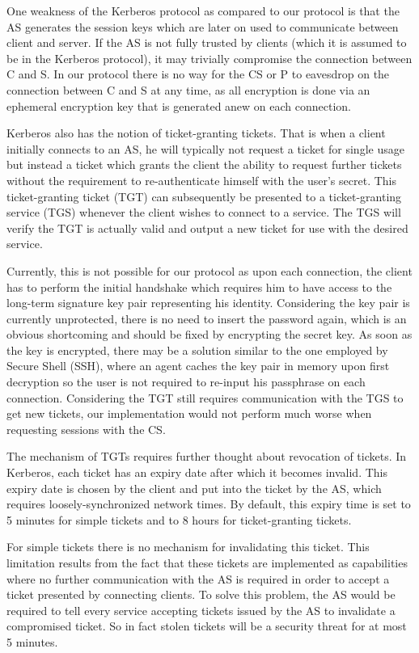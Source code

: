 One weakness of the Kerberos protocol as compared to our protocol is that the AS generates the session keys which are later on used to communicate between client and server.
If the AS is not fully trusted by clients (which it is assumed to be in the Kerberos protocol), it may trivially compromise the connection between C and S.
In our protocol there is no way for the CS or P to eavesdrop on the connection between C and S at any time, as all encryption is done via an ephemeral encryption key that is generated anew on each connection.

\bigskip

Kerberos also has the notion of ticket-granting tickets.
That is when a client initially connects to an AS, he will typically not request a ticket for single usage but instead a ticket which grants the client the ability to request further tickets without the requirement to re-authenticate himself with the user's secret.
This ticket-granting ticket (TGT) can subsequently be presented to a ticket-granting service (TGS) whenever the client wishes to connect to a service.
The TGS will verify the TGT is actually valid and output a new ticket for use with the desired service.

Currently, this is not possible for our protocol as upon each connection, the client has to perform the initial handshake which requires him to have access to the long-term signature key pair representing his identity.
Considering the key pair is currently unprotected, there is no need to insert the password again, which is an obvious shortcoming and should be fixed by encrypting the secret key.
As soon as the key is encrypted, there may be a solution similar to the one employed by Secure Shell (SSH), where an agent caches the key pair in memory upon first decryption so the user is not required to re-input his passphrase on each connection.
Considering the TGT still requires communication with the TGS to get new tickets, our implementation would not perform much worse when requesting sessions with the CS.

The mechanism of TGTs requires further thought about revocation of tickets.
In Kerberos, each ticket has an expiry date after which it becomes invalid.
This expiry date is chosen by the client and put into the ticket by the AS, which requires loosely-synchronized network times.
By default, this expiry time is set to 5 minutes for simple tickets and to 8 hours for ticket-granting tickets.

For simple tickets there is no mechanism for invalidating this ticket.
This limitation results from the fact that these tickets are implemented as capabilities where no further communication with the AS is required in order to accept a ticket presented by connecting clients.
To solve this problem, the AS would be required to tell every service accepting tickets issued by the AS to invalidate a compromised ticket.
So in fact stolen tickets will be a security threat for at most 5 minutes.

